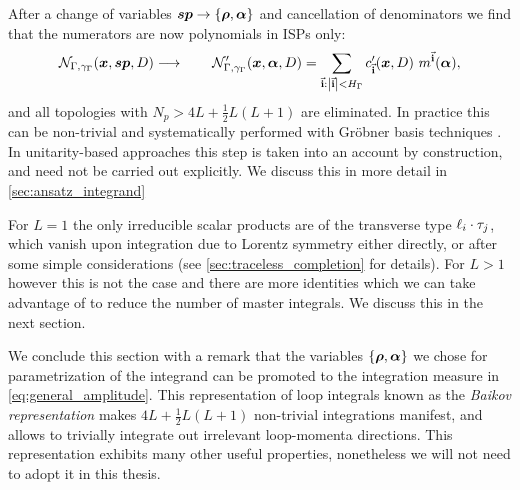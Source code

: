 After a change of variables $\vb*{sp}\to \{\vb*{\rho},\vb*{\alpha}\}$ and cancellation of denominators
we find that the numerators are now polynomials in ISPs only:
\begin{equation} \label{eq:rsp_reduction}
  \mathcal{N}_{\Gamma,\gamma_\Gamma}(\vb*{x}, \vb*{sp}, D) \longrightarrow \qquad
    \mathcal{N}^{\prime}_{\Gamma,\gamma_\Gamma}(\vb*{x}, \vb*{\alpha}, D) =
    \sum_{\va{i} : \abs{\va{i}} < H_{\Gamma}} c^{\prime}_{\va{i}} (\vb*{x},D)~ m^{\va{i}}(\vb*{\alpha}),
\end{equation}
and all topologies with $N_p > 4L +\frac{1}{2}L(L+1)$ are eliminated.
In practice this can be non-trivial and systematically performed with Gröbner basis techniques \cite{Zhang:2012ce,Mastrolia:2012wf,Mastrolia:2012an,Mastrolia:2016dhn}.
In unitarity-based approaches this step is taken into an account by construction,
and need not be carried out explicitly. We discuss this in more detail in \cref{sec:ansatz_integrand}

For $L=1$ the only irreducible scalar products are of the transverse type $\sp(\ell_i, \tau_j)$, which vanish upon integration due to Lorentz symmetry either directly,
or after some simple considerations (see \cref{sec:traceless_completion} for details).
For $L>1$ however this is not the case and there are more identities which we can take advantage of to reduce the number of master integrals.
We discuss this in the next section.


We conclude this section with a remark that the variables $\{\vb*{\rho},\vb*{\alpha}\}$ we chose for parametrization of the integrand can be promoted
to the integration measure in \cref{eq:general_amplitude}. This representation of loop integrals known as the \emph{Baikov representation} \cite{Baikov:1996rk} 
makes $4 L +\frac{1}{2}L(L+1)$ non-trivial integrations manifest, and allows to trivially integrate out irrelevant loop-momenta directions. This representation
exhibits many other useful properties, nonetheless we will not need to adopt it in this thesis.


